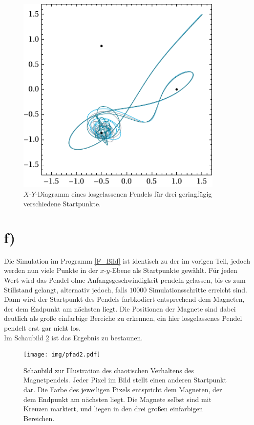 \begin{figure}[t]
	\centering
	\includegraphics[width=290pt]{img/xy.pdf}
	\caption{$X$-$Y$-Diagramm eines losgelassenen Pendels für drei geringfügig verschiedene Startpunkte.}
	\label{fig:xy}
\end{figure}


\section*{f)}
Die Simulation im Programm \ref{F_Bild} ist identisch zu der im vorigen Teil, jedoch werden nun viele Punkte in der $x$-$y$-Ebene als Startpunkte gewählt. Für jeden Wert wird das Pendel ohne Anfangsgeschwindigkeit pendeln gelassen, bis es zum Stillstand gelangt, alternativ jedoch, falls $10000$ Simulationsschritte erreicht sind. Dann wird der Startpunkt des Pendels farbkodiert entsprechend dem Magneten, der dem Endpunkt am nächsten liegt. Die Positionen der Magnete sind dabei deutlich als große einfarbige Bereiche zu erkennen, ein hier losgelassenes Pendel pendelt erst gar nicht los.\\
Im Schaubild \ref{fig:Bild} ist das Ergebnis zu bestaunen.


\begin{figure}[t]
	\centering
	\texttt{[image: img/pfad2.pdf]}
	\caption{Schaubild zur Illustration des chaotischen Verhaltens des Magnetpendels. Jeder Pixel im Bild stellt einen anderen Startpunkt dar. Die Farbe des jeweiligen Pixels entspricht dem Magneten, der dem Endpunkt am nächsten liegt. Die Magnete selbst sind mit Kreuzen markiert, und liegen in den drei großen einfarbigen Bereichen.}
	\label{fig:Bild}
\end{figure}

